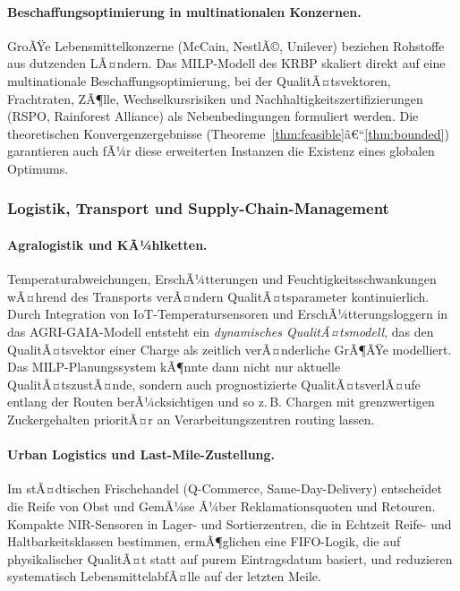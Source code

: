 ﻿\documentclass[12pt,a4paper]{article}
\theoremstyle{plain}
\theoremstyle{definition}
\begin{document}
	\paragraph{Beschaffungsoptimierung in multinationalen Konzernen.}
	GroÃŸe Lebensmittelkonzerne (McCain, NestlÃ©, Unilever) beziehen
	Rohstoffe aus dutzenden LÃ¤ndern. Das MILP-Modell des KRBP skaliert
	direkt auf eine multinationale Beschaffungsoptimierung, bei der
	QualitÃ¤tsvektoren, Frachtraten, ZÃ¶lle, Wechselkursrisiken und
	Nachhaltigkeitszertifizierungen (RSPO, Rainforest Alliance) als
	Nebenbedingungen formuliert werden. Die theoretischen Konvergenzergebnisse
	(Theoreme~\ref{thm:feasible}â€“\ref{thm:bounded}) garantieren auch
	fÃ¼r diese erweiterten Instanzen die Existenz eines globalen Optimums.

	\subsubsection{Logistik, Transport und Supply-Chain-Management}

	\paragraph{Agralogistik und KÃ¼hlketten.}
	Temperaturabweichungen, ErschÃ¼tterungen und Feuchtigkeitsschwankungen
	wÃ¤hrend des Transports verÃ¤ndern QualitÃ¤tsparameter kontinuierlich.
	Durch Integration von IoT-Temperatursensoren und ErschÃ¼tterungsloggern
	in das AGRI-GAIA-Modell entsteht ein \emph{dynamisches QualitÃ¤tsmodell},
	das den QualitÃ¤tsvektor einer Charge als zeitlich verÃ¤nderliche GrÃ¶ÃŸe
	modelliert. Das MILP-Planungssystem kÃ¶nnte dann nicht nur aktuelle
	QualitÃ¤tszustÃ¤nde, sondern auch prognostizierte QualitÃ¤tsverlÃ¤ufe
	entlang der Routen berÃ¼cksichtigen und so z.\,B. Chargen mit
	grenzwertigen Zuckergehalten prioritÃ¤r an Verarbeitungszentren
	routing lassen.

	\paragraph{Urban Logistics und Last-Mile-Zustellung.}
	Im stÃ¤dtischen Frischehandel (Q-Com\-merce, Same-Day-Delivery) entscheidet
	die Reife von Obst und GemÃ¼se Ã¼ber Reklamationsquoten und Retouren.
	Kompakte NIR-Sensoren in Lager- und Sortierzentren, die in Echtzeit
	Reife- und Haltbarkeitsklassen bestimmen, ermÃ¶glichen eine
	FIFO-Logik, die auf physikalischer QualitÃ¤t statt auf purem
	Eintragsdatum basiert, und reduzieren systematisch LebensmittelabfÃ¤lle
	auf der letzten Meile.
\end{document}
